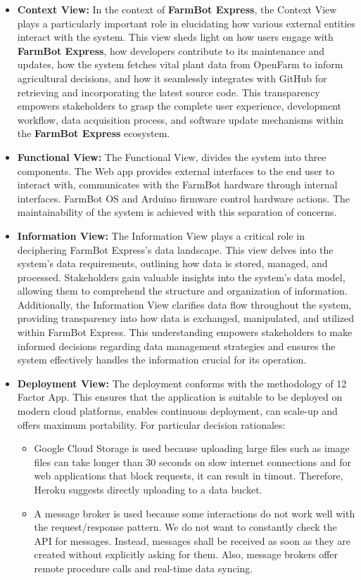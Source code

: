 \begin{itemize}
    \item \textbf{Context View:}
          In the context of \textbf{FarmBot Express}, the Context View plays a particularly important role in elucidating how various external entities interact with the system. This view sheds light on how users engage with \textbf{FarmBot Express}, how developers contribute to its maintenance and updates, how the system fetches vital plant data from OpenFarm to inform agricultural decisions, and how it seamlessly integrates with GitHub for retrieving and incorporating the latest source code. This transparency empowers stakeholders to grasp the complete user experience, development workflow, data acquisition process, and software update mechanisms within the \textbf{FarmBot Express} ecosystem.
    \item \textbf{Functional View:} The Functional View, divides the system into three components. The Web app provides external interfaces to the end user to interact with, communicates with the FarmBot hardware through internal interfaces. FarmBot OS and Arduino firmware control hardware actions. The maintainability of the system is achieved with this separation of concerns.
    \item \textbf{Information View:} The Information View plays a critical role in deciphering FarmBot Express's data landscape. This view delves into the system's data requirements, outlining how data is stored, managed, and processed. Stakeholders gain valuable insights into the system's data model, allowing them to comprehend the structure and organization of information. Additionally, the Information View clarifies data flow throughout the system, providing transparency into how data is exchanged, manipulated, and utilized within FarmBot Express. This understanding empowers stakeholders to make informed decisions regarding data management strategies and ensures the system effectively handles the information crucial for its operation.
    \item \textbf{Deployment View:} The deployment conforms with the methodology of 12 Factor App. This ensures that the application is suitable to be deployed on modern cloud platforms, enables continuous deployment, can scale-up and offers maximum portability. 
    For particular decision rationales: \begin{itemize}
        \item Google Cloud Storage is used because uploading large files such as image files can take longer than 30 seconds on slow internet connections and for web applications that block requests, it can result in timout. Therefore, Heroku suggests directly uploading to a data bucket.
        \item A message broker is used because some interactions do not work well with the request/response pattern. We do not want to constantly check the API for messages. Instead, messages shall be received as soon as they are created without explicitly asking for them. Also, message brokers offer remote procedure calls and real-time data syncing.
    \end{itemize} 
\end{itemize}
